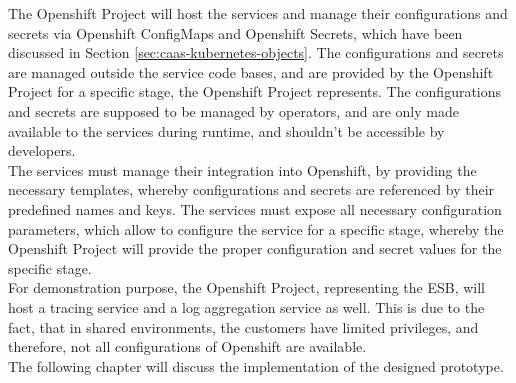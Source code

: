 The Openshift Project will host the services and manage their configurations and secrets via Openshift ConfigMaps and Openshift Secrets, which have been discussed in Section \vref{sec:caas-kubernetes-objects}. The configurations and secrets are managed outside the service code bases, and are provided by the Openshift Project for a specific stage, the Openshift Project represents. The configurations and secrets are supposed to be managed by operators, and are only made available to the services during runtime, and shouldn't be accessible by developers. \\

The services must manage their integration into Openshift, by providing the necessary templates, whereby configurations and secrets are referenced by their predefined names and keys. The services must expose all necessary configuration parameters, which allow to configure the service for a specific stage, whereby the Openshift Project will provide the proper configuration and secret values for the specific stage. \\

For demonstration purpose, the Openshift Project, representing the ESB, will host a tracing service and a log aggregation service as well. This is due to the fact, that in shared environments, the customers have limited privileges, and therefore, not all configurations of Openshift are available. \\

The following chapter will discuss the implementation of the designed prototype. 
